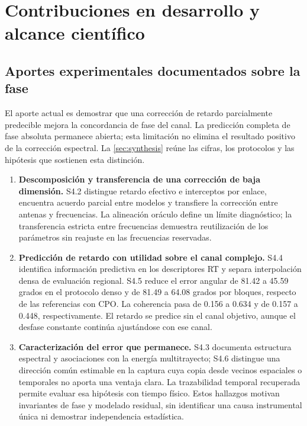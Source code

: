 \chapter{Contribuciones en desarrollo y alcance científico}
\label{ch:contributions}

\section{Aportes experimentales documentados sobre la fase}

El aporte actual es demostrar que una corrección de retardo parcialmente
predecible mejora la concordancia de fase del canal. La predicción completa de
fase absoluta permanece abierta; esta limitación no elimina el resultado
positivo de la corrección espectral. La \cref{sec:synthesis} reúne las cifras,
los protocolos y las hipótesis que sostienen esta distinción.

\begin{enumerate}
\item \textbf{Descomposición y transferencia de una corrección de baja dimensión.}
S4.2 distingue retardo efectivo e interceptos por enlace, encuentra acuerdo
parcial entre modelos y transfiere la corrección entre antenas y frecuencias.
La alineación oráculo define un límite diagnóstico; la transferencia estricta
entre frecuencias demuestra reutilización de los parámetros sin reajuste en
las frecuencias reservadas.
\item \textbf{Predicción de retardo con utilidad sobre el canal complejo.}
S4.4 identifica información predictiva en los descriptores RT y separa
interpolación densa de evaluación regional. S4.5 reduce el error angular de
81.42 a 45.59 grados en el protocolo denso y de 81.49 a 64.08 grados por
bloques, respecto de las referencias con CPO. La coherencia pasa de 0.156 a
0.634 y de 0.157 a 0.448, respectivamente. El retardo se predice sin el canal
objetivo, aunque el desfase constante continúa ajustándose con ese canal.
\item \textbf{Caracterización del error que permanece.}
S4.3 documenta estructura espectral y asociaciones con la energía multitrayecto;
S4.6 distingue una dirección común estimable en la captura cuya copia desde
vecinos espaciales o temporales no aporta una ventaja clara. La trazabilidad
temporal recuperada permite evaluar esa hipótesis con tiempo físico. Estos
hallazgos motivan invariantes de fase y modelado residual, sin identificar
una causa instrumental única ni demostrar independencia estadística.
\end{enumerate}

